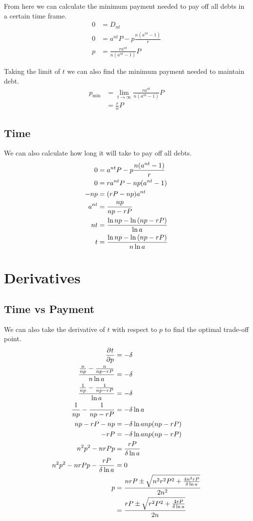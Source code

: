 \documentclass[12pt]{article}
\begin{document}
From here we can calculate the minimum payment needed to pay off all debts in
a certain time frame.
\begin{align*}
    0 &= D_{nt}\\
    0 &= a^{nt} P - p \frac{n (a^{nt} - 1)}{r}\\
    p &= \frac{r a^{nt}}{n (a^{nt} - 1)} P
\end{align*}

Taking the limit of $t$ we can also find the minimum payment needed to maintain
debt.
\begin{align*}
    p_\text{min} &= \lim_{t \to \infty} \frac{r a^{nt}}{n (a^{nt} - 1)} P\\
                 &= \frac{r}{n} P
\end{align*}


\subsection{Time}

We can also calculate how long it will take to pay off all debts.
\begin{align*}
    0 &= a^{nt} P - p \frac{n (a^{nt} - 1)}{r}\\
    0 &= ra^{nt} P - np (a^{nt} - 1)\\
    -np &= (rP - np) a^{nt}\\
    a^{nt} &= \frac{np}{np - rP}\\
    nt &= \frac{\ln{np} - \ln\del{np - rP}}{\ln{a}}\\
    t &= \frac{\ln{np} - \ln\del{np - rP}}{n\ln{a}}
\end{align*}


\section{Derivatives}

\subsection{Time vs Payment}

We can also take the derivative of $t$ with respect to $p$ to find the optimal
trade-off point.
\begin{align*}
    \dpd{t}{p} &= -\delta\\
    \frac{\frac{n}{np} - \frac{n}{np - rP}}{n \ln{a}} &= -\delta\\
    \frac{\frac{1}{np} - \frac{1}{np - rP}}{\ln{a}} &= -\delta\\
    \frac{1}{np} - \frac{1}{np - rP} &= -\delta \ln{a}\\
    np - rP - np &= -\delta \ln{a} np (np - rP)\\
    -rP &= -\delta \ln{a} np (np - rP)\\
    n^2 p^2 - nrP p &= \frac{rP}{\delta \ln{a}}\\
    n^2 p^2 - nrP p - \frac{rP}{\delta \ln{a}} &= 0\\
    p &= \frac{nrP \pm \sqrt{n^2r^2P^2 + \frac{4n^2 rP}{\delta \ln{a}}}}{2n^2}\\
      &= \frac{rP \pm \sqrt{r^2P^2 + \frac{4rP}{\delta \ln{a}}}}{2n}
\end{align*}
\end{document}
